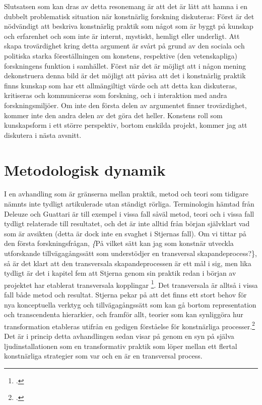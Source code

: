 \documentclass[11pt]{article}
\begin{document}
Slutsatsen som kan dras av detta resonemang är att det är lätt att
hamna i en dubbelt problematisk situation när konstnärlig forskning
diskuteras: Först är det nödvändigt att beskriva konstnärlig praktik
som något som är byggt på kunskap och erfarenhet och som inte är
internt, mystiskt, hemligt eller underligt. Att skapa trovärdighet
kring detta argument är svårt på grund av den sociala och politiska
starka föreställningen om konstens, respektive (den vetenskapliga)
forskningens funktion i samhället. Först när det är möjligt att i
någon mening dekonstruera denna bild är det möjligt att påvisa att det
i konstnärlig praktik finns kunskap som har ett allmängiltigt värde
och att detta kan diskuteras, kritiseras och kommuniceras som
forskning, och i interaktion med andra forskningsmiljöer. Om inte den
första delen av argumentet finner trovärdighet, kommer inte den andra
delen av det göra det heller. Konstens roll som kunskapsform i ett
större perspektiv, bortom enskilda projekt, kommer jag att diskutera i
nästa avsnitt.

\section*{Metodologisk dynamik}
\label{sec:org463364d}
I en avhandling som  är gränserna mellan
praktik, metod och teori som tidigare nämnts inte tydligt artikulerade
utan ständigt rörliga. Terminologin hämtad från Deleuze och Guattari
är till exempel i vissa fall såväl metod, teori och i vissa fall
tydligt relaterade till resultatet, och det är inte alltid från början
självklart vad som är avsikten (detta är dock inte en svaghet i
Stjernas fall). Om vi tittar på den första forskningsfrågan, \emph\{På
    vilket sätt kan jag som konstnär utveckla utforskande
    tillvägagångssätt som understödjer en transversal
    skapandeprocess?\}, så är det klart att den transversala
skapandeprocessen är ett mål i sig, men lika tydligt är det i kapitel
fem att Stjerna genom sin praktik redan i början av projektet
har etablerat transversala kopplingar \footcite[s.145]{Stjerna2018}. Det
transversala är alltså i vissa fall både metod och resultat. Stjerna
pekar på att det finns ett stort behov för nya konceptuella verktyg
och tillvägagångssätt som kan gå bortom representation och
transcendenta hierarkier, och framför allt, teorier som kan synliggöra
hur transformation etableras utifrån en gedigen förståelse för
konstnärliga processer.\footcite[s.85]{Stjerna2018} Det är i princip
detta avhandlingen sedan visar på genom en syn på själva
ljudinstallationen som en transformativ praktik som löper mellan ett
flertal konstnärliga strategier som var och en är en transversal
process.
\end{document}
